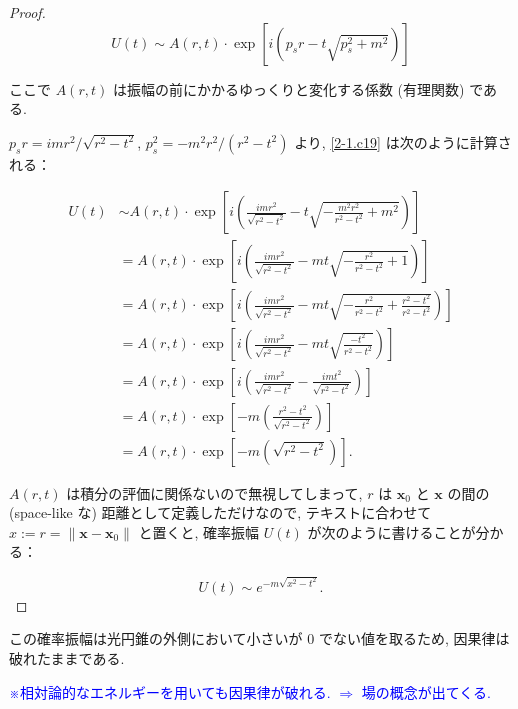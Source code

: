 \documentclass[a4paper,12pt]{article}
\begin{document}
\begin{proof}
\begin{equation*}\label{2-1.c19}
  U(t) \sim A(r,t) \cdot \exp\left[i(p_s r - t\sqrt{p_s^2 + m^2})\right] \tag{2-1.c19}
\end{equation*}

ここで $A(r,t)$ は振幅の前にかかるゆっくりと変化する係数 (有理関数) である.\par
$p_s r = imr^2/\sqrt{r^2 - t^2}$, $p_s^2 = -m^2 r^2/(r^2 - t^2)$ より, \eqref{2-1.c19} は次のように計算される：

\begin{align*}
  U(t) &\sim A(r,t) \cdot \exp\left[i\left( \frac{imr^2}{\sqrt{r^2 - t^2}} - t \sqrt{-\frac{m^2 r^2}{r^2 - t^2} + m^2} \right)\right] \tag{2-1.c21} \\
  &= A(r,t) \cdot \exp\left[i\left( \frac{imr^2}{\sqrt{r^2 - t^2}} - mt \sqrt{-\frac{ r^2}{r^2 - t^2} + 1} \right)\right] \tag{2-1.c22}\\
  &= A(r,t) \cdot \exp\left[i\left( \frac{imr^2}{\sqrt{r^2 - t^2}} - mt \sqrt{-\frac{ r^2}{r^2 - t^2} + \frac{r^2 - t^2}{r^2 - t^2}} \right)\right] \tag{2-1.c23}\\
  &= A(r,t) \cdot \exp\left[i\left( \frac{imr^2}{\sqrt{r^2 - t^2}} - mt \sqrt{\frac{-t^2}{r^2 - t^2}} \right)\right] \tag{2-1.c24}\\
  &= A(r,t) \cdot \exp\left[i\left( \frac{imr^2}{\sqrt{r^2 - t^2}} - \frac{imt^2}{\sqrt{r^2 - t^2}} \right)\right] \tag{2-1.c25}\\
  &= A(r,t) \cdot \exp\left[-m\left( \frac{r^2 - t^2}{\sqrt{r^2 - t^2}} \right)\right] \tag{2-1.c26}\\
  &= A(r,t) \cdot \exp\left[-m\left( \sqrt{r^2 - t^2} \right)\right]. \tag{2-1.c27}
\end{align*}

$A(r,t)$ は積分の評価に関係ないので無視してしまって, $r$ は $\boldsymbol{x}_0$ と $\boldsymbol{x}$ の間の (space-like な) 距離として定義しただけなので, テキストに合わせて $x := r = \| \boldsymbol{x} - \boldsymbol{x}_0 \|$ と置くと, 確率振幅 $U(t)$ が次のように書けることが分かる：

\begin{equation*}
  U(t) \sim e^{-m\sqrt{x^2 - t^2}}. \tag{2-1.c28}
\end{equation*}

\end{proof}

\color{black}

この確率振幅は光円錐の外側において小さいが $0$ でない値を取るため, 因果律は破れたままである. \par
\textcolor{blue}{※相対論的なエネルギーを用いても因果律が破れる. $\Longrightarrow$ 場の概念が出てくる. }
\end{document}
